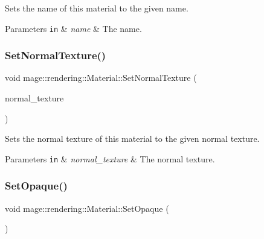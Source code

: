 Sets the name of this material to the given name.


\begin{DoxyParams}[1]{Parameters}
\mbox{\tt in}  & {\em name} & The name. \\
\hline
\end{DoxyParams}
\mbox{\label{classmage_1_1rendering_1_1_material_a1a1ae2ba12c62c1d076f04124f1f64f6}} 
\subsubsection{\texorpdfstring{Set\+Normal\+Texture()}{SetNormalTexture()}}
{\footnotesize\ttfamily void mage\+::rendering\+::\+Material\+::\+Set\+Normal\+Texture (\begin{DoxyParamCaption}\item[{\mbox{\hyperlink{namespacemage_1_1rendering_a6f3ae54f825328465b0cdde0f0de4a36}{Texture\+Ptr}}}]{normal\+\_\+texture }\end{DoxyParamCaption})}

Sets the normal texture of this material to the given normal texture.


\begin{DoxyParams}[1]{Parameters}
\mbox{\tt in}  & {\em normal\+\_\+texture} & The normal texture. \\
\hline
\end{DoxyParams}
\mbox{\label{classmage_1_1rendering_1_1_material_a23741c39e6ad9a8d12b7793bc3da4131}} 
\subsubsection{\texorpdfstring{Set\+Opaque()}{SetOpaque()}}
{\footnotesize\ttfamily void mage\+::rendering\+::\+Material\+::\+Set\+Opaque (\begin{DoxyParamCaption}{ }\end{DoxyParamCaption})\hspace{0.3cm}{\ttfamily [noexcept]}}

